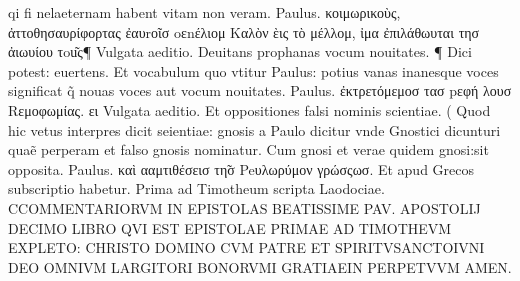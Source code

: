 \documentclass{article}
\begin{document}
\begin{pages}
qi fi nelaeternam habent vitam non veram. Paulus. κοιμωρικοὺς, ἀττοθησαυρίφορτας ἐαυrοῖσ oεnέλιομ Καλὸν ὲις τὸ μέλλομ, ἰμα ἐπιλάθωυται τησ ἀιωυίου τou͂ς¶ Vulgata aeditio. Deuitans prophanas vocum nouitates. ¶ Dici potest: euertens. Et vocabulum quo vtitur Paulus: potius vanas inanesque voces significat q̃ nouas voces aut vocum nouitates. Paulus. ἐκτρετόμεμοσ τασ pεφή λουσ Rεμοφωμίας. ει Vulgata aeditio. Et oppositiones falsi nominis scientiae. ( Quod hic vetus interpres dicit seientiae: gnosis a Paulo dicitur vnde Gnostici dicunturi quaẽ perperam et falso gnosis nominatur. Cum gnosi et verae quidem gnosi:sit opposita. Paulus. καὶ ααμτιθέσεισ τη̃σ Peυλωρύμον γρώσςωσ. Et apud Grecos subscriptio habetur. Prima ad Timotheum  scripta Laodociae.  \pend\pstart CCOMMENTARIORVM IN EPISTOLAS BEATISSIME PAV. APOSTOLIJ DECIMO LIBRO QVI EST EPISTOLAE PRIMAE AD TIMOTHEVM EXPLETO: CHRISTO DOMINO CVM PATRE ET SPIRITVSANCTOIVNI DEO OMNIVM LARGITORI BONORVMI GRATIAEIN PERPETVVM AMEN.  \pend
\endnumbering
\end{pages}
\end{document}
